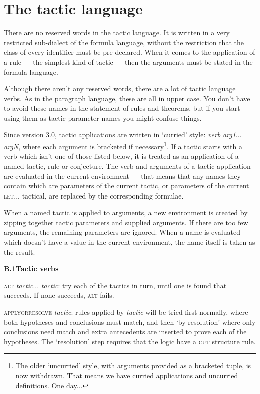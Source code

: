 \chapter{The tactic language}
\label{appx:tacticlang}


There are no reserved words in the tactic language. It is written in a very restricted sub-dialect of the formula language, without the restriction that the class of every identifier must be pre-declared. When it comes to the application of a rule --- the simplest kind of tactic --- then the arguments must be stated in the formula language.


Although there aren't any reserved words, there are a lot of tactic language verbs. As in the paragraph language, these are all in upper case. You don't have to avoid these names in the statement of rules and theorems, but if you start using them as tactic parameter names you might confuse things.


Since version 3.0, tactic applications are written in `curried' style: \textit{verb} \textit{arg1}... \textit{argN}, where each argument is bracketed if necessary\footnote{The older `uncurried' style, with arguments provided as a bracketed tuple, is now withdrawn. That means we have curried applications and uncurried definitions. One day...}. If a tactic starts with a verb which isn't one of those listed below, it is treated as an application of a named tactic, rule or conjecture. The verb and arguments of a tactic application are evaluated in the current environment --- that means that any names they contain which are parameters of the current tactic, or parameters of the current \textsc{let...} tactical, are replaced by the corresponding formulae.


When a named tactic is applied to arguments, a new environment is created by zipping together tactic parameters and supplied arguments. If there are too few arguments, the remaining parameters are ignored. When a name is evaluated which doesn't have a value in the current environment, the name itself is taken as the result.


\textbf{{\large B.1\tab Tactic verbs}}


\textsc{alt} \textit{tactic}... \textit{tactic}: try each of the tactics in turn, until one is found that succeeds. If none succeeds, \textsc{alt} fails.


\textsc{applyorresolve} \textit{tactic}: rules applied by \textit{tactic} will be tried first normally, where both hypotheses and conclusions must match, and then `by resolution' where only conclusions need match and extra antecedents are inserted to prove each of the hypotheses. The `resolution' step requires that the logic have a \textsc{cut} structure rule.


